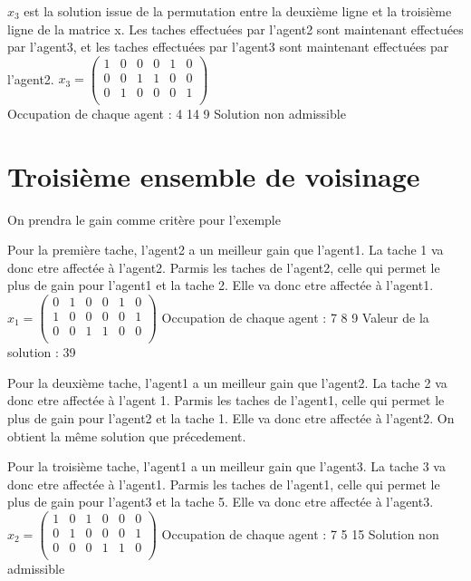 \documentclass[a4paper,12pt,titlepage]{report}
\begin{document}
$x_{3}$ est la solution issue de la permutation entre la deuxième ligne et la troisième ligne de la matrice x. Les taches effectuées par l'agent2 sont maintenant effectuées par l'agent3, et les taches effectuées par l'agent3 sont maintenant effectuées par l'agent2.
$x_{3} = \begin{pmatrix}
 1&0&0&0&1&0 \\
 0&0&1&1&0&0 \\
 0&1&0&0&0&1 \\
\end{pmatrix}$\\
Occupation de chaque agent : 4 14 9
Solution non admissible

\section{Troisième ensemble de voisinage}

On prendra le gain comme critère pour l'exemple

Pour la première tache, l'agent2 a un meilleur gain que l'agent1. La tache 1 va donc etre affectée à l'agent2. Parmis les taches de l'agent2, celle qui permet le plus de gain pour l'agent1 et la tache 2. Elle va donc etre affectée à l'agent1.
$x_{1} = \begin{pmatrix}
 0&1&0&0&1&0 \\
 1&0&0&0&0&1 \\
 0&0&1&1&0&0 \\
\end{pmatrix}$
Occupation de chaque agent : 7 8 9
Valeur de la solution : 39

Pour la deuxième tache, l'agent1 a un meilleur gain que l'agent2. La tache 2 va donc etre affectée à l'agent 1. Parmis les taches de l'agent1, celle qui permet le plus de gain pour l'agent2 et la tache 1. Elle va donc etre affectée à l'agent2.
On obtient la même solution que précedement.

Pour la troisième tache, l'agent1 a un meilleur gain que l'agent3. La tache 3 va donc etre affectée à l'agent1. Parmis les taches de l'agent1, celle qui permet le plus de gain pour l'agent3 et la tache 5. Elle va donc etre affectée à l'agent3.
$x_{2} = \begin{pmatrix}
 1&0&1&0&0&0 \\
 0&1&0&0&0&1 \\
 0&0&0&1&1&0 \\
\end{pmatrix}$
Occupation de chaque agent : 7 5 15
Solution non admissible
\end{document}
